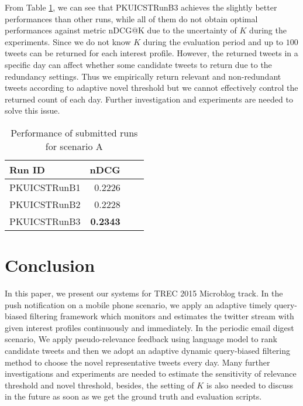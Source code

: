 From Table \ref{tab:resB}, we can see that PKUICSTRunB3 achieves the slightly better performances than other runs, while all of them do not obtain optimal performances against metric nDCG@K due to the uncertainty of $K$ during the experiments. Since we do not know $K$ during the evaluation period and up to $100$ tweets can be returned for each interest profile. However, the returned tweets in a specific day can affect whether some candidate tweets to return due to the redundancy settings. Thus we empirically return relevant and non-redundant tweets according to adaptive novel threshold but we cannot effectively control the returned count of each day. Further investigation and experiments are needed to solve this issue.

\begin{table}[htbp]
\centering
\caption{Performance of submitted runs for scenario A}
\label{tab:resB}
\begin{tabular}{lrrr}
\hline
Run ID&nDCG\\
\hline
PKUICSTRunB1&0.2226\\
PKUICSTRunB2&0.2228\\
PKUICSTRunB3&\textbf{0.2343}\\
\hline
\end{tabular}
\end{table}

\section{Conclusion}
In this paper, we present our systems for TREC 2015 Microblog track.
In the push notification on a mobile phone scenario, 
we apply an adaptive timely query-biased filtering framework which monitors and estimates the twitter stream with given interest profiles continuously and immediately.
In the periodic email digest scenario,
We apply pseudo-relevance feedback using language model to rank candidate tweets and then we adopt an adaptive dynamic query-biased filtering method to choose the novel representative tweets every day.
Many further investigations and experiments are needed to estimate the sensitivity of relevance threshold and novel threshold, besides, the setting of $K$ is also needed to discuss in the future as soon as we get the ground truth and evaluation scripts.






